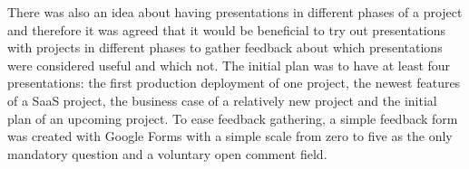 There was also an idea about having presentations in different phases of a project and therefore it was agreed that it would be beneficial to try out presentations with
projects in different phases to gather feedback about which presentations were considered useful and which not. The initial plan was to have at least four presentations:
the first production deployment of one project, the newest features of a SaaS project, the business case of a relatively new project and the initial plan of an upcoming project.
To ease feedback gathering, a simple feedback form was created with Google Forms with a simple scale from zero to five as the only mandatory question and a voluntary
open comment field.